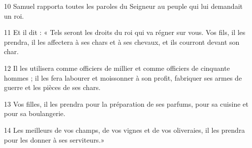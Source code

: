 
10 Samuel rapporta toutes les paroles du Seigneur au peuple qui lui demandait un roi.

11 Et il dit : « Tels seront les droits du roi qui va régner sur vous. Vos fils, il les prendra, il les affectera à ses chars et à ses chevaux, et ils courront devant son char.

12 Il les utilisera comme officiers de millier et comme officiers de cinquante hommes ; il les fera labourer et moissonner à son profit, fabriquer ses armes de guerre et les pièces de ses chars.

13 Vos filles, il les prendra pour la préparation de ses parfums, pour sa cuisine et pour sa boulangerie.

14 Les meilleurs de vos champs, de vos vignes et de vos oliveraies, il les prendra pour les donner à ses serviteurs.»